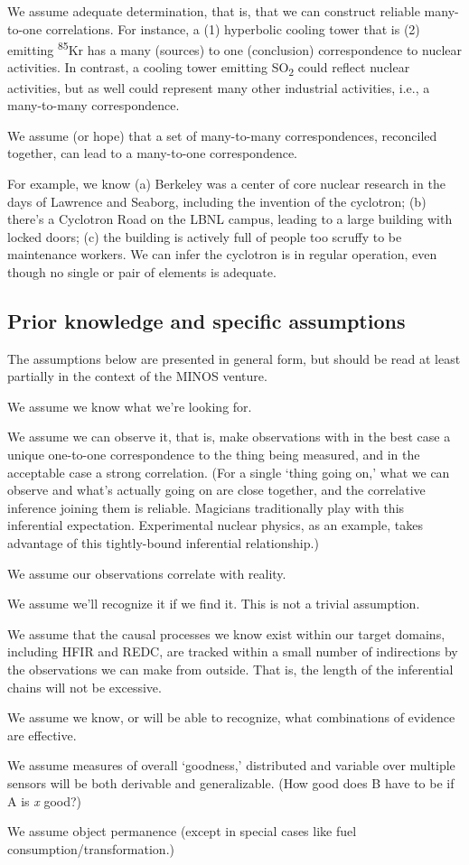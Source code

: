 \documentclass{article} %
\begin{document}
We assume adequate determination, that is, that we can construct reliable many-to-one correlations. For instance, a (1) hyperbolic cooling tower that is (2) emitting \textsuperscript{85}Kr has a many (sources) to one (conclusion) correspondence to nuclear activities. In contrast, a cooling tower emitting SO\textsubscript{2} could reflect nuclear activities, but as well could represent many other industrial activities, i.e., a many-to-many correspondence. 

We assume (or hope) that a set of many-to-many correspondences, reconciled together, can lead to a many-to-one correspondence. 
 
For example, we know (a) Berkeley was a center of core nuclear research in the days of Lawrence and Seaborg, including the invention of the cyclotron; (b) there's a Cyclotron Road on the LBNL campus, leading to a large building with locked doors; (c) the building is actively full of people too scruffy to be maintenance workers. We can infer the cyclotron is in regular operation, even though no single or pair of elements is adequate. 


\subsection{Prior knowledge and specific assumptions}
The assumptions below are presented in general form, but should be read at least partially in the context of the MINOS venture.
\begin{itemize*}
\item We assume we know what we're looking for. 
\item We assume we can observe it, that is, make observations with in the best case a unique one-to-one correspondence to the thing being measured, and in the acceptable case a strong correlation. (For a single `thing going on,' what we can observe and what's actually going on are close together, and the correlative inference joining them is reliable. Magicians traditionally play with this inferential expectation. Experimental nuclear physics, as an example, takes advantage of this tightly-bound inferential relationship.)
\item We assume our observations correlate with reality. 
\item We assume we'll recognize it if we find it. This is not a trivial assumption.
\item We assume that the causal processes we know exist within our target domains, including HFIR and REDC, are tracked within a small number of indirections by the observations we can make from outside. That is, the length of the inferential chains will not be excessive.
\item We assume we know, or will be able to recognize, what combinations of evidence are effective. 
\item We assume measures of overall `goodness,' distributed and variable over multiple sensors will be both derivable and generalizable. (How good does B have to be if A is \textit{x} good?)
\item We assume object permanence (except in special cases like fuel consumption/transformation.)
\end{itemize*}
\end{document}
